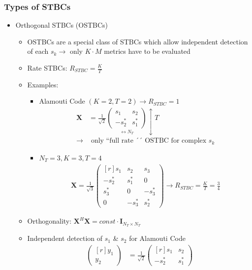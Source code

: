\documentclass[a4paper, 10pt]{article}
\begin{document}
\subsubsection{Types of STBCs}
\begin{itemize}
	\item Orthogonal STBCs (OSTBCs)
	\begin{itemize}
		\item OSTBCs are a special class of STBCs which allow independent detection of each $s_k \rightarrow$ only $K\cdot M$ metrics have to be evaluated
		\item Rate STBCs: $R_{STBC} = \frac{K}{T}$
		\item Examples:
		\begin{itemize}
			\item Alamouti Code  $(K = 2, T = 2) \rightarrow R_{STBC} = 1$
			\begin{align*}
				\textbf{X} &= \frac{1}{\sqrt{2}}\underset{\longleftrightarrow N_T}{\begin{pmatrix} s_1 & s_2 \\ -s_2^* & s_1^*	\end{pmatrix}}\updownarrow T\\
				\rightarrow &\text{ only ``full rate ´´ OSTBC for complex } s_k
			\end{align*}
			\item $N_T = 3, K = 3, T = 4$
			\begin{align*}
				\textbf{X} = \frac{1}{\sqrt{3}}\begin{pmatrix*}[r]	s_1 & s_2 & s_3 \\ -s_2^*  & s_1^* & 0 \\ s_3^* & 0 & -s_3^*\\0 & -s_3^* & s_2^*\end{pmatrix*} \rightarrow R_{STBC} = \frac{K}{T} = \frac{3}{4}
			\end{align*}
		\end{itemize}
		\item Orthogonality: $\textbf{X}^H\textbf{X} = {const}\cdot \textbf{I}_{N_T\times N_T}$
		\item Independent detection of $s_1$ \& $s_2$ for Alamouti Code
		\begin{align*}
				\begin{pmatrix*}[r]y_1 \\y_2 
			\end{pmatrix*} &= \frac{1}{\sqrt{2}}
			\begin{pmatrix*}[r]	s_1 & s_2 \\-s_2^* & s_1^*

\end{pmatrix*}
\end{align*}
\end{itemize}
\end{itemize}
\end{document}
